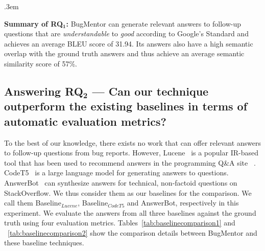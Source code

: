 \FrameSep.3em
\begin{frshaded}
	\noindent
	\textbf{Summary of RQ$\mathbf{_1}$:} BugMentor can generate relevant answers to follow-up questions that are \textit{understandable} to \textit{good} according to Google's Standard and achieves an average BLEU score of 31.94. Its answers also have a high semantic overlap with the ground truth answers and thus achieve an average semantic similarity score of 57\%.
\end{frshaded}

\subsection{Answering RQ$\mathbf{_2}$ --- Can our technique outperform the existing baselines in terms of automatic evaluation metrics?}\label{results:rq2}

To the best of our knowledge, there exists no work that can offer relevant answers to follow-up questions from bug reports. However, Lucene~\cite{mccandless2010lucene} is a popular IR-based tool that has been used to recommend answers in the programming Q\&A site ~\cite{Atwood_2017,ponzanelli2013leveraging}.
CodeT5~\cite{wang2021codet5} is a large language model for generating answers to questions. AnswerBot~\cite{xu2017answerbot} can synthesize
answers for technical, non-factoid questions on StackOverflow. We thus consider them as our baselines for the comparison. We call them Baseline$_{Lucene}$, Baseline$_{CodeT5}$ and AnswerBot, respectively in this experiment. We evaluate the answers from all three baselines against the ground truth using four evaluation metrics. Tables~\ref{tab:baselinecomparison1} and ~\ref{tab:baselinecomparison2} show the comparison details between BugMentor and these baseline techniques.\par

